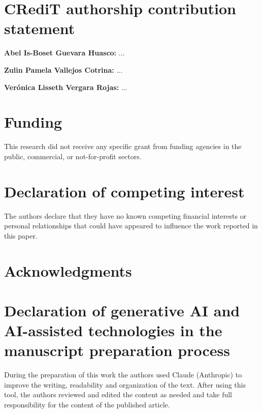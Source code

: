 \documentclass[preprint,12pt]{elsarticle}   %
\begin{document}
\section*{CRediT authorship contribution statement}
\noindent\textbf{Abel Is-Boset Guevara Huasco:} ...\par
\noindent\textbf{Zulin Pamela Vallejos Cotrina:} ...\par
\noindent\textbf{Ver\'onica Lisseth Vergara Rojas:} ...\par

\section*{Funding}
This research did not receive any specific grant from funding agencies in the public, commercial, or not-for-profit sectors.

\section*{Declaration of competing interest}
The authors declare that they have no known competing financial interests or personal relationships that could have
appeared to influence the work reported in this paper.

\section*{Acknowledgments}

\section*{Declaration of generative AI and AI-assisted technologies in the manuscript preparation process}
During the preparation of this work the authors used Claude (Anthropic) to improve the writing, readability and
organization of the text. After using this tool, the authors reviewed and edited the content as needed and take full
responsibility for the content of the published article.



\end{document}
